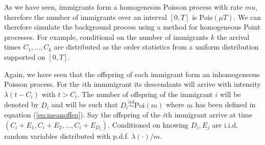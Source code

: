 As we have seen, immigrants form a homogeneous Poisson process with rate $mu$, therefore the number of immigrants over an interval $[0, T]$ is $\text{Pois}(\mu T)$. We can therefore simulate the background process using a method for homogeneous Point processes. For example, conditional on the number of immigrants $k$ the arrival times $C_1, \dots, C_k$ are distributed as the order statistics from a uniform distribution supported on $[0, T]$.

Again, we have seen that the offspring of each immigrant form an inhomogeneous Poisson process. For the $i$th immmigrant its descendants will arrive with intensity $\lambda(t-C_i)$ with $t > C_i$. The number of offspring of the immigrant $i$ will be denoted by $D_i$ and will be such that $D_i \overset{iid}{\sim}\text{Poi}(m)$ where $m$ has been defined in equation (\ref{eq:meanoffsp}). Say the offspring of the $i$th immigrant arrive at time $(C_i + E_1, C_i + E_2, \dots, C_i + E_{D_i})$. Conditioned on knowing $D_i, E_j$ are i.i.d. random variables distributed with p.d.f. $\lambda(\cdot)/m$.
